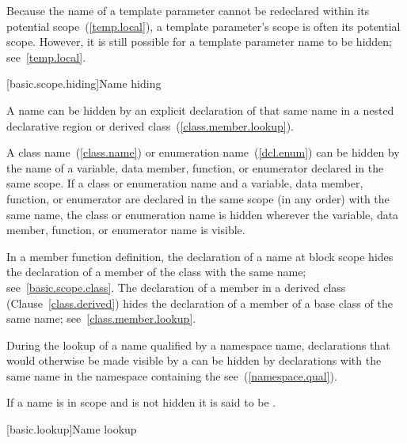 \pnum
\enternote Because the name of a template parameter cannot be redeclared within its
potential scope~(\ref{temp.local}), a template parameter's scope is often its potential
scope. However, it is still possible for a template parameter name to be hidden;
see~\ref{temp.local}. \exitnote

[basic.scope.hiding]{Name hiding}

\pnum
{}%
%
%
A name can be hidden by an explicit declaration of that same name in a
nested declarative region or derived class~(\ref{class.member.lookup}).

\pnum
{}%
A class name~(\ref{class.name}) or enumeration name~(\ref{dcl.enum}) can
be hidden by the name of a variable, data member, function, or enumerator declared in
the same scope. If a class or enumeration name and a variable, data member, function,
or enumerator are declared in the same scope (in any order) with the
same name, the class or enumeration name is hidden wherever the variable, data member,
function, or enumerator name is visible.

\pnum
In a member function definition, the declaration of a name
at block scope
hides
the declaration of a member of the class with the same name;
see~\ref{basic.scope.class}. The declaration of a member in a derived
class (Clause~\ref{class.derived}) hides the declaration of a member of
a base class of the same name; see~\ref{class.member.lookup}.

\pnum
During the lookup of a name qualified by a namespace name, declarations
that would otherwise be made visible by a  can
be hidden by declarations with the same name in the namespace containing
the  see~(\ref{namespace.qual}).

\pnum
{}%
If a name is in scope and is not hidden it is said to be .%

[basic.lookup]{Name lookup}%
%
%


